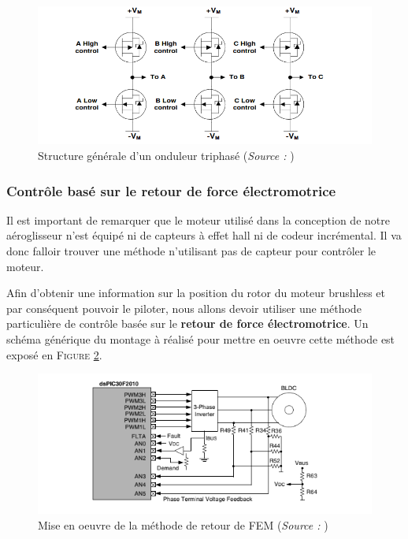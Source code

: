 \documentclass[a4paper,12pt]{report}
\begin{document}
				\begin{figure}[h]
				 	\begin{center}
				 		\includegraphics[scale=0.7]{../Illus/three_phase_bridge.png}
				 	\end{center}
				 	\caption{Structure générale d'un onduleur triphasé (\textit{Source :} \cite{AN857})}
				 	\label{three_phase_bridge}
				 \end{figure}	
				 
				 \vspace{-1em}		
			
			\subsubsection{Contrôle basé sur le retour de force électromotrice}
			
			\vspace{-1em}
			
			Il est important de remarquer que le moteur utilisé dans la conception de notre aéroglisseur n'est  équipé ni de capteurs à effet hall ni de codeur incrémental. Il va donc falloir trouver une méthode n'utilisant pas de capteur pour contrôler le moteur.
			
			Afin d'obtenir une information sur la position du rotor du moteur brushless et par conséquent pouvoir le piloter, nous allons devoir utiliser une méthode particulière de contrôle basée sur le \textbf{retour de force électromotrice}. Un schéma générique du montage à réalisé pour mettre en oeuvre cette méthode est exposé en \textsc{Figure \ref{back_emf_scheme}}.	
			
			\begin{figure}[h]
				 	\begin{center}
				 		\includegraphics[scale=0.8]{../Illus/back_emf_scheme.png}
				 	\end{center}
				 	\caption{Mise en oeuvre de la méthode de retour de FEM (\textit{Source :} \cite{AN992})}
				 	\label{back_emf_scheme}
				 \end{figure}	
				 
\end{document}
